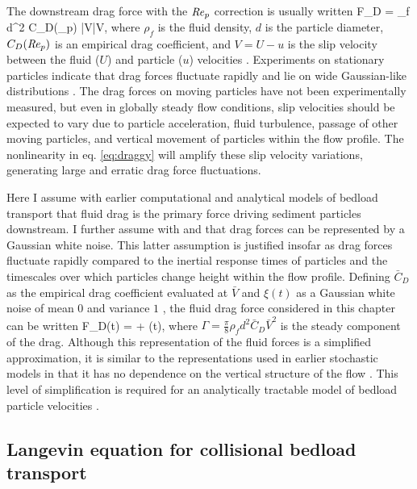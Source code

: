 The downstream drag force with the $\mbox{\textit{Re}}_p$ correction is usually written 
\be F_D =  \rho_f d^2 C_D(\Rey_p) |V|V, \label{eq:draggy}\ee
where $\rho_f$ is the fluid density, $d$ is the particle diameter, $C_D(\mbox{\textit{Re}}_p)$ is an empirical drag coefficient, and $V = U-u$ is the slip velocity between the fluid ($U$) and particle ($u$) velocities \citep{Coleman1967, Schmeeckle2007, Dwivedi2012}.
Experiments on stationary particles indicate that drag forces fluctuate rapidly and lie on wide Gaussian-like distributions \citep{Hofland2006,Schmeeckle2007,Dwivedi2010,Celik2014}.
The drag forces on moving particles have not been experimentally measured, but even in globally steady flow conditions, slip velocities should be expected to vary due to particle acceleration, fluid turbulence, passage of other moving particles, and vertical movement of particles within the flow profile.
The nonlinearity in eq. \ref{eq:draggy} will amplify these slip velocity variations, generating large and erratic drag force fluctuations.

Here I assume with earlier computational \citep{Schmeeckle2014,Gonzalez2017,Elghannay2017} and analytical \citep[e.g.][]{Ancey2014,Fan2014} models of bedload transport that fluid drag is the primary force driving sediment particles downstream. I further assume with \citet{Fan2014} and \citet{Ancey2014} that drag forces can be represented by a Gaussian white noise.
This latter assumption is justified insofar as drag forces fluctuate rapidly compared to the inertial response times of particles and the timescales over which particles change height within the flow profile.
Defining $\bar{C}_D$ as the empirical drag coefficient evaluated at $\bar{V}$ and $\xi(t)$ as a Gaussian white noise of mean $0$ and variance $1$ \citep[e.g.][]{Gardiner1983}, the fluid drag force considered in this chapter can be written
\be F_D(t) = \Gamma +  \eta(t), \label{eq:drag}\ee
where $\Gamma = \frac{\pi}{8}
\rho_f d^2 \bar{C}_D \bar{V}^2$ is the steady component of the drag.
Although this representation of the fluid forces is a simplified approximation, it is similar to the representations used in earlier stochastic models in that it has no dependence on the vertical structure of the flow \citep[e.g.][]{Fan2014,Ancey2014}. This level of simplification is required for an analytically tractable model of bedload particle velocities \citep[e.g.][]{Michaelides1997}.

\subsection{Langevin equation for collisional bedload transport}

